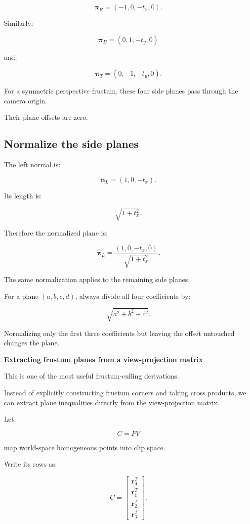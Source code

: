 \[
 \boxed{ \boldsymbol\pi_R=(-1,0,-t_x,0) }.
\]

Similarly:

\[
 \boxed{ \boldsymbol\pi_B=(0,1,-t_y,0) }
\]

and:

\[
 \boxed{ \boldsymbol\pi_T=(0,-1,-t_y,0) }.
\]

For a symmetric perspective frustum, these four side planes pass through the camera origin.

Their plane offsets are zero.

\subsection{Normalize the side planes}\label{02-foundations-ii-ch034-normalize-the-side-planes}

The left normal is:

\[
 \mathbf n_L=(1,0,-t_x).
\]

Its length is:

\[
 \sqrt{1+t_x^2}.
\]

Therefore the normalized plane is:

\[
 \boxed{ \hat{\boldsymbol\pi}_L= \frac{(1,0,-t_x,0)} {\sqrt{1+t_x^2}} }.
\]

The same normalization applies to the remaining side planes.

For a plane \((a,b,c,d)\), always divide all four coefficients by:

\[
 \sqrt{a^2+b^2+c^2}.
\]

Normalizing only the first three coefficients but leaving the offset untouched changes the plane.

\textbf{Extracting frustum planes from a view-projection matrix}

This is one of the most useful frustum-culling derivations.

Instead of explicitly constructing frustum corners and taking cross products, we can extract plane inequalities directly from the view-projection matrix.

Let:

\[
 \boxed{ C=PV }
\]

map world-space homogeneous points into clip space.

Write its rows as:

\[
 C= \begin{bmatrix} \mathbf r_0^T\\ \mathbf r_1^T\\ \mathbf r_2^T\\ \mathbf r_3^T \end{bmatrix}.
\]

